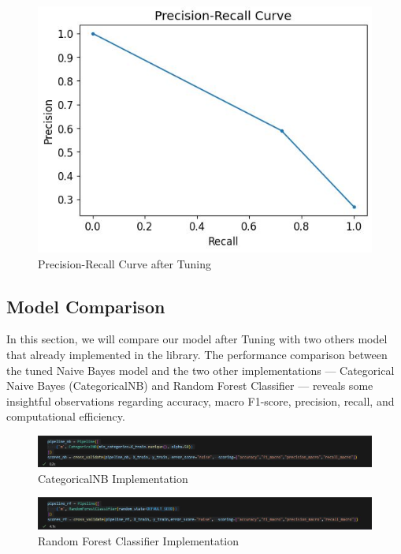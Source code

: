 \begin{figure}[hbt!]
    \centering
    \includegraphics[width=1\linewidth]{Images/6.7d.jpg}
    \caption{Precision-Recall Curve after Tuning}
    \label{fig:enter-label}
\end{figure}

\subsection{Model Comparison}
In this section, we will compare our model after Tuning with two others model that already implemented in the library. The performance comparison between the tuned Naive Bayes model and the two other implementations — Categorical Naive Bayes (CategoricalNB) and Random Forest Classifier — reveals some insightful observations regarding accuracy, macro F1-score, precision, recall, and computational efficiency.\\

\begin{figure}[hbt!]
    \centering
    \includegraphics[width=1\linewidth]{Images/6.8a.jpg}
    \caption{CategoricalNB Implementation}
    \label{fig:enter-label}
\end{figure}

\begin{figure}[hbt!]
    \centering
    \includegraphics[width=1\linewidth]{Images/6.8b.jpg}
    \caption{Random Forest Classifier Implementation}
    \label{fig:enter-label}
\end{figure}

